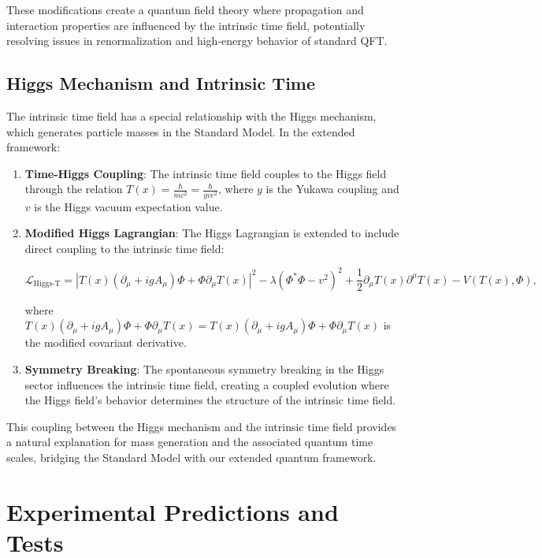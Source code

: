 \documentclass[12pt,a4paper]{article}
\newcommand{\Tfield}{T(x)}
\newcommand{\DhiggsT}{\Tfield (\partial_\mu + ig A_\mu) \Phi + \Phi \partial_\mu \Tfield}
\begin{document}
	These modifications create a quantum field theory where propagation and interaction properties are influenced by the intrinsic time field, potentially resolving issues in renormalization and high-energy behavior of standard QFT.
	
	\subsection{Higgs Mechanism and Intrinsic Time}
	\label{subsec:higgs_intrinsic}
	
	The intrinsic time field has a special relationship with the Higgs mechanism, which generates particle masses in the Standard Model. In the extended framework:
	
	\begin{enumerate}
		\item \textbf{Time-Higgs Coupling}: The intrinsic time field couples to the Higgs field through the relation $\Tfield = \frac{\hbar}{mc^2} = \frac{\hbar}{y v c^2}$, where $y$ is the Yukawa coupling and $v$ is the Higgs vacuum expectation value.
		
		\item \textbf{Modified Higgs Lagrangian}: The Higgs Lagrangian is extended to include direct coupling to the intrinsic time field:
		
		\begin{equation}
			\mathcal{L}_{\text{Higgs-T}} = |\DhiggsT|^2 - \lambda(\Phi^* \Phi - v^2)^2 + \frac{1}{2}\partial_\mu \Tfield \partial^\mu \Tfield - V(\Tfield, \Phi),
			\label{eq:higgs_lagrangian}
		\end{equation}
		
		where $\DhiggsT = \Tfield (\partial_\mu + ig A_\mu) \Phi + \Phi \partial_\mu \Tfield$ is the modified covariant derivative.
		
		\item \textbf{Symmetry Breaking}: The spontaneous symmetry breaking in the Higgs sector influences the intrinsic time field, creating a coupled evolution where the Higgs field's behavior determines the structure of the intrinsic time field.
	\end{enumerate}
	
	This coupling between the Higgs mechanism and the intrinsic time field provides a natural explanation for mass generation and the associated quantum time scales, bridging the Standard Model with our extended quantum framework.
	
	\section{Experimental Predictions and Tests}
	\label{sec:experimental}
	
\end{document}
